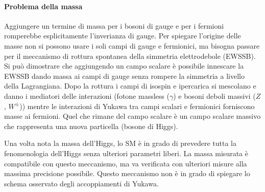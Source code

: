 \paragraph{Problema della massa} Aggiungere un termine di massa per i bosoni di gauge e per i fermioni romperebbe esplicitamente l'inverianza di gauge. Per spiegare l'origine delle masse non si possono usare i soli campi di gauge e fermionici, ma bisogna passare per il meccanismo di rottura spontanea della simmetria elettrodebole (EWSSB). Si può dimostrare che aggiungendo un campo scalare è possibile innescare la EWSSB dando massa ai campi di gauge senza rompere la simmetria a livello della Lagrangiana. Dopo la rottura i campi di isospin e ipercarica si mescolano e danno i mediatori delle interazioni (fotone massless ($\gamma$) e bosoni deboli massivi ($Z$, $W^\pm$)) mentre le interazioni di Yukawa tra campi scalari e fermionici forniscono masse ai fermioni. Quel che rimane del campo scalare è un campo scalare massivo che rappresenta una nuova particella (bosone di Higgs).

Una volta nota la massa dell'Higgs, lo SM è in grado di prevedere tutta la fenomenologia dell'Higgs senza ulteriori parametri liberi. La massa misurata è compatibile con questo meccanismo, ma va verificata con ulteriori misure alla massima precisione possibile. Questo meccanismo non è in grado di spiegare lo schema osservato degli accoppiamenti di Yukawa.

